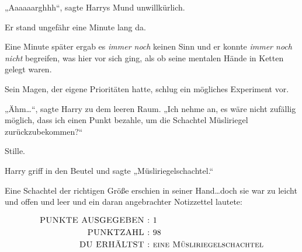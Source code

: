 „Aaaaaarghhh“, sagte Harrys Mund unwillkürlich.

Er stand ungefähr eine Minute lang da.

Eine Minute später ergab es \emph{immer noch} keinen Sinn und er konnte \emph{immer noch nicht} begreifen, was hier vor sich ging, als ob seine mentalen Hände in Ketten gelegt waren.

Sein Magen, der eigene Prioritäten hatte, schlug ein mögliches Experiment vor.

„Ähm…“, sagte Harry zu dem leeren Raum. „Ich nehme an, es wäre nicht zufällig möglich, dass ich einen Punkt bezahle, um die Schachtel Müsliriegel zurückzubekommen?“

Stille.

Harry griff in den Beutel und sagte „Müsliriegelschachtel.“

Eine Schachtel der richtigen Größe erschien in seiner Hand…doch sie war zu leicht und offen und leer und ein daran angebrachter Notizzettel lautete:
\begin{writtenNote}
\begin{align*}
\hbox{\scshape \uppercase{Punkte ausgegeben}~: }&\hbox{1}\\
\hbox{\scshape \uppercase{Punktzahl}~: }&\hbox{98}\\
\hbox{\scshape \uppercase{Du erhältst}~: }&\hbox{\scshape eine Müsliriegelschachtel}
\end{align*}
\end{writtenNote}

